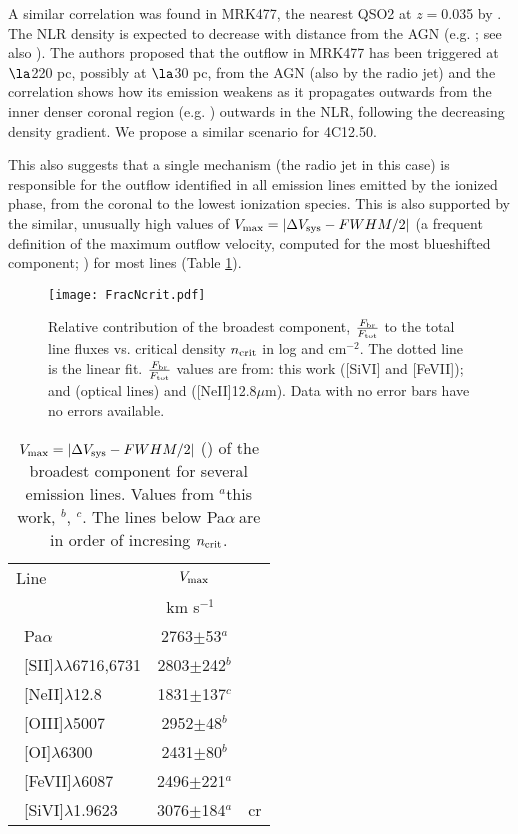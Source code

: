 \documentclass{aa}
\newcommand{\kms}{km s$^{-1}$~}
\newcommand{\pa}{Pa$\alpha~$}
\begin{document}
A similar correlation was found in  MRK477, the nearest QSO2 at $z=$0.035  by \cite{Villar2015}.   The NLR density is expected to decrease with distance from the AGN (e.g. \citealt{Bennert2006}; see also \citealt{DeRobertis1984}). The authors proposed that the  outflow in MRK477 has been triggered  at $\la$220  pc, possibly at $\la$30 pc, from the AGN (also by the radio jet) and the correlation shows how its emission weakens as it propagates outwards from the inner denser coronal region (e.g. \citealt{Muller2006,Rose2011}) outwards in the NLR, following the decreasing density gradient. We propose a similar scenario  for 4C12.50. 

 This also suggests that a single mechanism (the radio jet in this case) is responsible for the outflow identified in all emission lines emitted by the ionized phase, from the coronal to the lowest ionization species.  This is also supported by the  similar, unusually high  values of $V_{\rm max} =|\Delta V_{\rm sys} - FWHM/2|$ (a frequent definition of the maximum outflow velocity, computed for the most blueshifted component; \citealt{Rupke2005b}) for most lines (Table \ref{tab-vmax}). 

\begin{figure}
\centering
\texttt{[image: FracNcrit.pdf]}
\caption{Relative contribution  of the broadest component, $\frac{F_{\rm br}}{F_{\rm tot}}$ to the total line fluxes vs. critical density $n_{\rm crit}$ in log and cm$^{-2}$. The dotted line is the linear fit. $\frac{F_{\rm br}}{F_{\rm tot}}$  values are from: this work ([SiVI] and [FeVII]);  \cite{Holt2003} and \cite{Rodriguez2013} (optical lines) and \citealt{Guillard2012} ([NeII]12.8$\mu$m).  Data with no error bars have no errors available.}
\label{fig-ncrit}
\end{figure}
    
\begin{table}
\centering
\begin{tabular}{lcc}
\hline
Line	&		 $V_{\rm max}$\\ 
	&	 \kms \\ \hline
~Pa$\alpha$ & 2763$\pm$53$^a$  \\
~[SII]$\lambda\lambda$6716,6731 &  2803$\pm$242$^b$  \\
~[NeII]$\lambda$12.8	& 	1831$\pm$137$^c$  \\
~[OIII]$\lambda$5007 &   2952$\pm$48$^b$ \\
~[OI]$\lambda$6300   &		 2431$\pm$80$^b$  \\
~[FeVII]$\lambda$6087 &		 2496$\pm$221$^a$ \\
~[SiVI]$\lambda$1.9623 & 3076$\pm$184$^a$ &cr\\
\hline
\end{tabular}	
\caption{$V_{\rm max} =|\Delta V_{\rm sys} - FWHM/2|$ (\citealt{Rupke2005b}) of the broadest component for  several emission lines. Values from $^a$this work, $^b$\cite{Holt2003}, $^c$\citealt{Guillard2012}. The lines below \pa are in order of incresing $n_{\rm crit}$.}
\label{tab-vmax}
\end{table}
\end{document}

